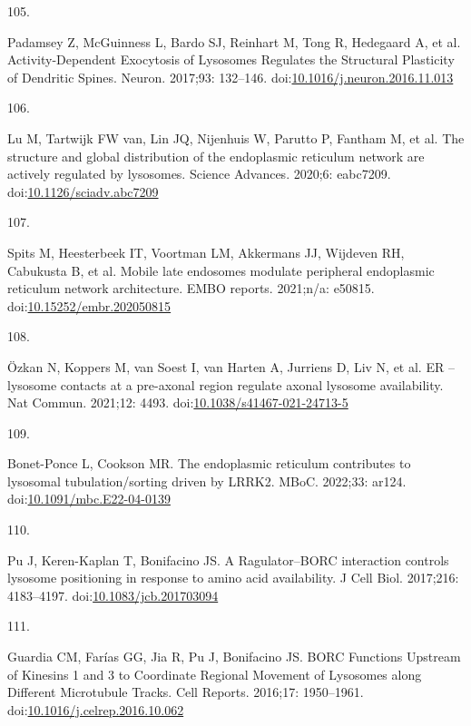 \documentclass[
  12pt,
  a4paper,
]{book}
\newlength{\cslhangindent}
\newlength{\csllabelwidth}
\newenvironment{CSLReferences}[2] %
 {\begin{list}{}{%
  \setlength{\itemindent}{0pt}
  \setlength{\leftmargin}{0pt}
  \setlength{\parsep}{0pt}
  \ifodd #1
   \setlength{\leftmargin}{\cslhangindent}
   \setlength{\itemindent}{-1\cslhangindent}
  \fi
  \setlength{\itemsep}{#2\baselineskip}}}
 {\end{list}}
\newcommand{\CSLLeftMargin}[1]{\parbox[t]{\csllabelwidth}{\strut#1\strut}}
\newcommand{\CSLRightInline}[1]{\parbox[t]{\linewidth - \csllabelwidth}{\strut#1\strut}}
\begin{document}
\begin{CSLReferences}{0}{1}
\CSLLeftMargin{105. }%
\CSLRightInline{Padamsey Z, McGuinness L, Bardo SJ, Reinhart M, Tong R, Hedegaard A, et al. Activity-{Dependent Exocytosis} of {Lysosomes Regulates} the {Structural Plasticity} of {Dendritic Spines}. Neuron. 2017;93: 132--146. doi:\href{https://doi.org/10.1016/j.neuron.2016.11.013}{10.1016/j.neuron.2016.11.013}}

\CSLLeftMargin{106. }%
\CSLRightInline{Lu M, Tartwijk FW van, Lin JQ, Nijenhuis W, Parutto P, Fantham M, et al. The structure and global distribution of the endoplasmic reticulum network are actively regulated by lysosomes. Science Advances. 2020;6: eabc7209. doi:\href{https://doi.org/10.1126/sciadv.abc7209}{10.1126/sciadv.abc7209}}

\CSLLeftMargin{107. }%
\CSLRightInline{Spits M, Heesterbeek IT, Voortman LM, Akkermans JJ, Wijdeven RH, Cabukusta B, et al. Mobile late endosomes modulate peripheral endoplasmic reticulum network architecture. EMBO reports. 2021;n/a: e50815. doi:\href{https://doi.org/10.15252/embr.202050815}{10.15252/embr.202050815}}

\CSLLeftMargin{108. }%
\CSLRightInline{Özkan N, Koppers M, van Soest I, van Harten A, Jurriens D, Liv N, et al. {ER} -- lysosome contacts at a pre-axonal region regulate axonal lysosome availability. Nat Commun. 2021;12: 4493. doi:\href{https://doi.org/10.1038/s41467-021-24713-5}{10.1038/s41467-021-24713-5}}

\CSLLeftMargin{109. }%
\CSLRightInline{Bonet-Ponce L, Cookson MR. The endoplasmic reticulum contributes to lysosomal tubulation/sorting driven by {LRRK2}. MBoC. 2022;33: ar124. doi:\href{https://doi.org/10.1091/mbc.E22-04-0139}{10.1091/mbc.E22-04-0139}}

\CSLLeftMargin{110. }%
\CSLRightInline{Pu J, Keren-Kaplan T, Bonifacino JS. A {Ragulator}--{BORC} interaction controls lysosome positioning in response to amino acid availability. J Cell Biol. 2017;216: 4183--4197. doi:\href{https://doi.org/10.1083/jcb.201703094}{10.1083/jcb.201703094}}

\CSLLeftMargin{111. }%
\CSLRightInline{Guardia CM, Farías GG, Jia R, Pu J, Bonifacino JS. {BORC Functions Upstream} of {Kinesins} 1 and 3 to {Coordinate Regional Movement} of {Lysosomes} along {Different Microtubule Tracks}. Cell Reports. 2016;17: 1950--1961. doi:\href{https://doi.org/10.1016/j.celrep.2016.10.062}{10.1016/j.celrep.2016.10.062}}


\end{CSLReferences}
\end{document}
